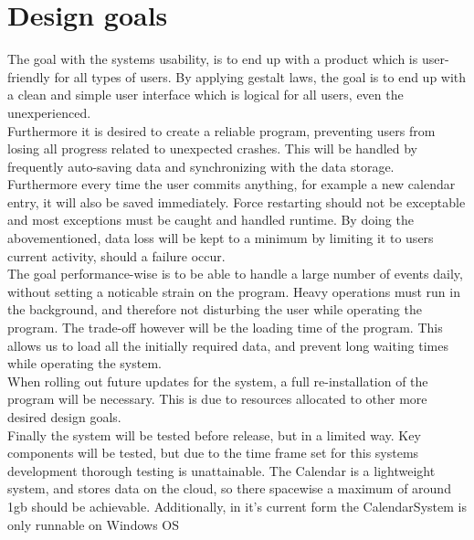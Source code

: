 \section{Design goals}
The goal with the systems usability, is to end up with a product which is user-friendly for all types of users. By applying gestalt laws, the goal is to end up with a clean and simple user interface which is logical for all users, even the unexperienced.\\
Furthermore it is desired to create a reliable program, preventing users from losing all progress related to unexpected crashes. This will be handled by frequently auto-saving data and synchronizing with the data storage. Furthermore every time the user commits anything, for example a new calendar entry, it will also be saved immediately. Force restarting should not be exceptable and most exceptions must be caught and handled runtime. By doing the abovementioned, data loss will be kept to a minimum by limiting it to users current activity, should a failure occur.\\
The goal performance-wise is to be able to handle a large number of events daily, without setting a noticable strain on the program. Heavy operations must run in the background, and therefore not disturbing the user while operating the program. The trade-off however will be the loading time of the program. This allows us to load all the initially required data, and prevent long waiting times while operating the system.\\
When rolling out future updates for the system, a full re-installation of the program will be necessary. This is due to resources allocated to other more desired design goals.\\
Finally the system will be tested before release, but in a limited way. Key components will be tested, but due to the time frame set for this systems development thorough testing is unattainable. The Calendar is a lightweight system, and stores data on the cloud, so there spacewise a maximum of around 1gb should be achievable. Additionally, in it's current form the CalendarSystem is only runnable on Windows OS\\